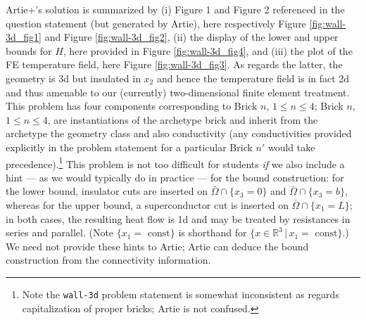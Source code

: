 \documentclass[preprint,12pt]{article}
\def\RR{\mathbb{R}}
\begin{document}
Artie+'s solution is summarized by (i) Figure 1 and Figure 2 referenced in the question statement (but generated by Artie), here respectively Figure \ref{fig:wall-3d_fig1} and Figure \ref{fig:wall-3d_fig2}, (ii) the display of the lower and upper bounds for $H$, here provided in Figure \ref{fig:wall-3d_fig4}, and (iii) the plot of the FE temperature field, here Figure \ref{fig:wall-3d_fig3}. As regards the latter, the geometry is 3d but insulated in $x_2$ and hence the temperature field is in fact 2d and thus amenable to our (currently) two-dimensional finite element treatment. This problem has four components corresponding to Brick $n$, $1 \le n \le 4$; Brick $n$, $1 \le n \le 4$, are instantiations of the archetype brick and inherit from the archetype the geometry class and also conductivity (any conductivities provided explicitly in the problem statement for a particular Brick $n'$ would take precedence).\footnote{Note the \texttt{wall-3d} problem statement is somewhat inconsistent as regards capitalization of proper bricks; Artie is not confused.} This problem is not too difficult for students {\em if} we also include a hint --- as we would typically do in practice --- for the bound construction: for the lower bound, insulator cuts are inserted on $\bar \Omega \cap \{x_3 = 0\}$ and $\bar \Omega \cap \{x_3 = b\}$, whereas for the upper bound, a superconductor cut is inserted on $\bar \Omega \cap \{x_1 = L\}$; in both cases, the resulting heat flow is 1d and may be treated by resistances in series and parallel. (Note $\{x_1 = \text{ const}\}$ is shorthand for $\{ x \in \RR^3 \,| \, x_1 = \text{ const}\}$.) We need not provide these hints to Artie; Artie can deduce the bound construction from the connectivity information.
\end{document}
